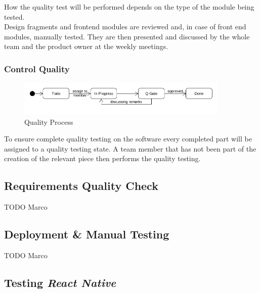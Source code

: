 How the quality test will be performed depends on the type of the module being tested.\\
Design fragments and frontend modules are reviewed and, in case of front end modules, manually tested. They are then presented and discussed by the whole team and the product owner at the weekly meetings.\\

\subsubsection{Control Quality}
\label{ssec:control_quality}

\begin{figure}[H]
    \begin{center}
        \includegraphics[width=0.9\textwidth]{images/state-quality.png}
        \caption{Quality Process}
        \label{fig:quality_process}
    \end{center}
\end{figure}

To ensure complete quality testing on the software every completed part will be assigned to a quality testing state. A team member that has not been part of the creation of the relevant piece then performs the quality testing.

\subsection{Requirements Quality Check}
\label{ssec:requirements_quality_check}

TODO Marco

\subsection{Deployment \& Manual Testing}
\label{ssec:deployment_manual_testing}

TODO Marco

\subsection{Testing \textit{React Native}}
\label{ssec:testing_react_native}

